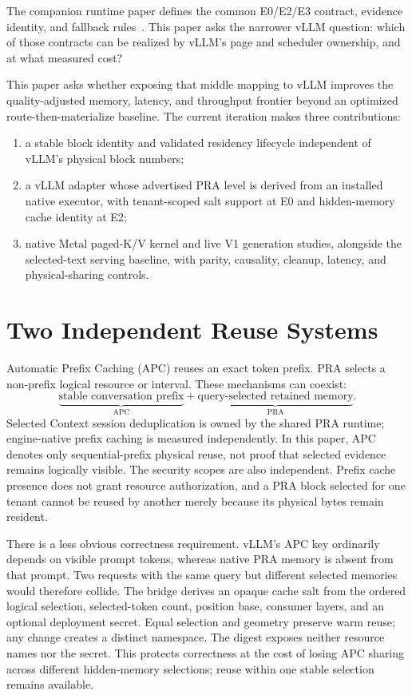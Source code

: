 \documentclass[10pt]{article}
\begin{document}
The companion runtime paper defines the common E0/E2/E3 contract, evidence
identity, and fallback rules~\cite{praruntime}. This paper asks the narrower
vLLM question: which of those contracts can be realized by vLLM's page and
scheduler ownership, and at what measured cost?

This paper asks whether exposing that middle mapping to vLLM improves the
quality-adjusted memory, latency, and throughput frontier beyond an optimized
route-then-materialize baseline. The current iteration makes three
contributions:
\begin{enumerate}[leftmargin=*]
  \item a stable block identity and validated residency lifecycle independent
  of vLLM's physical block numbers;
  \item a vLLM adapter whose advertised PRA level is derived from an installed
  native executor, with tenant-scoped salt support at E0 and hidden-memory
  cache identity at E2;
  \item native Metal paged-K/V kernel and live V1 generation studies, alongside
  the selected-text serving baseline, with parity, causality, cleanup, latency,
  and physical-sharing controls.
\end{enumerate}

\section{Two Independent Reuse Systems}
Automatic Prefix Caching (APC) reuses an exact token prefix. PRA selects a
non-prefix logical resource or interval. These mechanisms can coexist:
\[
  \underbrace{\text{stable conversation prefix}}_{\text{APC}}
  +
  \underbrace{\text{query-selected retained memory}}_{\text{PRA}}.
\]
Selected Context session deduplication is owned by the shared PRA runtime;
engine-native prefix caching is measured independently. In this paper, APC
denotes only sequential-prefix physical reuse, not proof that selected evidence
remains logically visible.
The security scopes are also independent. Prefix cache presence does not grant
resource authorization, and a PRA block selected for one tenant cannot be
reused by another merely because its physical bytes remain resident.

There is a less obvious correctness requirement. vLLM's APC key ordinarily
depends on visible prompt tokens, whereas native PRA memory is absent from that
prompt. Two requests with the same query but different selected memories would
therefore collide. The bridge derives an opaque cache salt from the ordered
logical selection, selected-token count, position base, consumer layers, and
an optional deployment secret. Equal selection and geometry preserve warm
reuse; any change creates a distinct namespace. The digest exposes neither
resource names nor the secret. This protects correctness at the cost of losing
APC sharing across different hidden-memory selections; reuse within one stable
selection remains available.
\end{document}
